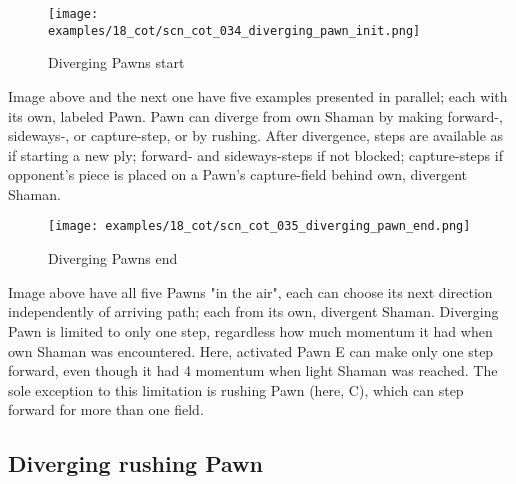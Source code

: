 \vspace*{-1.4\baselineskip}
\noindent
\begin{figure}[!h]
\texttt{[image: examples/18\_cot/scn\_cot\_034\_diverging\_pawn\_init.png]}
\vspace*{-1.3\baselineskip}
\caption{Diverging Pawns start}
\label{fig:scn_cot_034_diverging_pawn_init}
\end{figure}

\vspace*{-0.5\baselineskip}
Image above and the next one have five examples presented in parallel; each with
its own, labeled Pawn. \newline
\indent
Pawn can diverge from own Shaman by making forward-, sideways-, or capture-step,
or by rushing. After divergence, steps are available as if starting a new ply;
forward- and sideways-steps if not blocked; capture-steps if opponent's piece is
placed on a Pawn's capture-field behind own, divergent Shaman.

\clearpage %

\vspace*{-2.1\baselineskip}
\noindent
\begin{figure}[!h]
\texttt{[image: examples/18\_cot/scn\_cot\_035\_diverging\_pawn\_end.png]}
\vspace*{-1.3\baselineskip}
\caption{Diverging Pawns end}
\label{fig:scn_cot_035_diverging_pawn_end}
\end{figure}

\vspace*{-0.4\baselineskip}
Image above have all five Pawns "in the air", each can choose its next direction
independently of arriving path; each from its own, divergent Shaman. \newline
\indent
Diverging Pawn is limited to only one step, regardless how much momentum it had
when own Shaman was encountered. Here, activated Pawn E can make only one step
forward, even though it had 4 momentum when light Shaman was reached. The sole
exception to this limitation is rushing Pawn (here, C), which can step forward
for more than one field.

\clearpage %

\subsection*{Diverging rushing Pawn}
\label{sec:Conquest of Tlalocan/Divergence/Diverging rushing Pawn}

